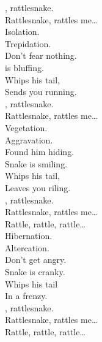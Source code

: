 
\label{album:flying-microtonal-banana}





, rattlesnake. \\
Rattlesnake, rattles me… \\

Isolation. \\
Trepidation. \\
Don't fear nothing. \\
 is bluffing. \\
Whips his tail, \\
Sends you running. \\

, rattlesnake. \\
Rattlesnake, rattles me… \\

Vegetation. \\
Aggravation. \\
Found him hiding. \\
Snake is smiling. \\
Whips his tail, \\
Leaves you riling. \\

, rattlesnake. \\
Rattlesnake, rattles me… \\

Rattle, rattle, rattle… \\

Hibernation. \\
Altercation. \\
Don't get angry. \\
Snake is cranky. \\
Whips his tail \\
In a frenzy. \\

, rattlesnake. \\
Rattlesnake, rattles me… \\

Rattle, rattle, rattle… \\

